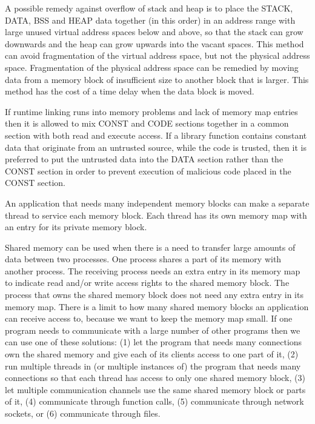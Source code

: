 \documentclass[forwardcom.tex]{subfiles}
\begin{document}
A possible remedy against overflow of stack and heap is to place the STACK, DATA, BSS and HEAP data together (in this order) in an address range with large unused virtual address spaces below and above, so that the stack can grow downwards and the heap can grow upwards into the vacant spaces. This method can avoid fragmentation of the virtual address space, but not the physical address space. Fragmentation of the physical address space can be remedied by moving data from a memory block of insufficient size to another block that is larger. This method has the cost of a time delay when the data block is moved. 
\vspace{2mm}

If runtime linking runs into memory problems and lack of memory map entries then it is allowed to mix CONST and CODE sections together in a common section with both read and execute access. If a library function contains constant data that originate from an untrusted source, while the code is trusted, then it is preferred to put the untrusted data into the DATA section rather than the CONST section in order to prevent execution of malicious code placed in the CONST section.
\vspace{2mm}

An application that needs many independent memory blocks can make a separate thread to service each memory block. Each thread has its own memory map with an entry for its private memory block.
\vspace{2mm}

\label{sharedMemory} Shared memory can be used when there is a need to transfer large amounts of data between two processes. One process shares a part of its memory with another process. The receiving process needs an extra entry in its memory map to indicate read and/or write access rights to the shared memory block. The process that owns the shared memory block does not need any extra entry in its memory map. There is a limit to how many shared memory blocks an application can receive access to, because we want to keep the memory map small. If one program needs to communicate with a large number of other programs then we can use one of these solutions: (1) let the program that needs many connections own the shared memory and give each of its clients access to one part of it, (2) run multiple threads in (or multiple instances of) the program that needs many connections so that each thread has access to only one shared memory block, (3) let multiple communication channels use the same shared memory block or parts of it, (4) communicate through function calls, (5) communicate through network sockets, or (6) communicate through files. 
\vspace{2mm}
\end{document}
